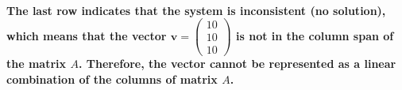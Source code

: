 \paragraph{The last row indicates that the system is inconsistent (no solution), which means that the vector \( \mathbf{v} = \begin{pmatrix} 10 \\ 10 \\ 10 \end{pmatrix} \) is not in the column span of the matrix \( A \). Therefore, the vector cannot be represented as a linear combination of the columns of matrix \( A \).}